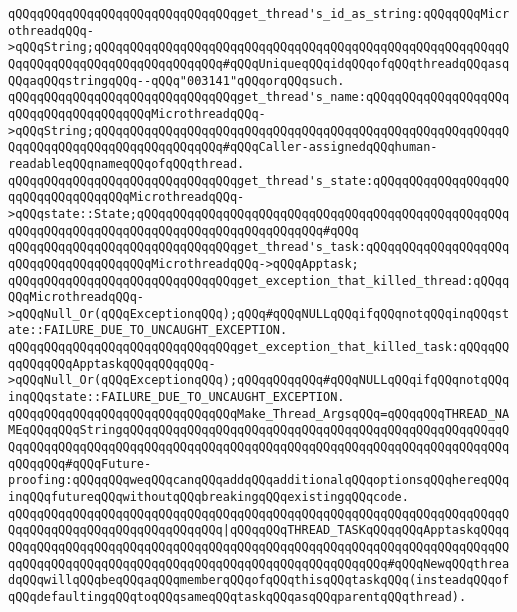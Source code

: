 \verb|qQQqqQQqqQQqqQQqqQQqqQQqqQQqqQQqget_thread's_id_as_string:qQQqqQQqMicrothreadqQQq->qQQqString;qQQqqQQqqQQqqQQqqQQqqQQqqQQqqQQqqQQqqQQqqQQqqQQqqQQqqQQqqQQqqQQqqQQqqQQqqQQqqQQqqQQqqQQq#qQQqUniqueqQQqidqQQqofqQQqthreadqQQqasqQQqaqQQqstringqQQq--qQQq"003141"qQQqorqQQqsuch.|\newline
\verb|qQQqqQQqqQQqqQQqqQQqqQQqqQQqqQQqget_thread's_name:qQQqqQQqqQQqqQQqqQQqqQQqqQQqqQQqqQQqqQQqMicrothreadqQQq->qQQqString;qQQqqQQqqQQqqQQqqQQqqQQqqQQqqQQqqQQqqQQqqQQqqQQqqQQqqQQqqQQqqQQqqQQqqQQqqQQqqQQqqQQqqQQq#qQQqCaller-assignedqQQqhuman-readableqQQqnameqQQqofqQQqthread.|\newline
\verb|qQQqqQQqqQQqqQQqqQQqqQQqqQQqqQQqget_thread's_state:qQQqqQQqqQQqqQQqqQQqqQQqqQQqqQQqqQQqMicrothreadqQQq->qQQqstate::State;qQQqqQQqqQQqqQQqqQQqqQQqqQQqqQQqqQQqqQQqqQQqqQQqqQQqqQQqqQQqqQQqqQQqqQQqqQQqqQQqqQQqqQQqqQQqqQQq#qQQq|\newline
\verb|qQQqqQQqqQQqqQQqqQQqqQQqqQQqqQQqget_thread's_task:qQQqqQQqqQQqqQQqqQQqqQQqqQQqqQQqqQQqqQQqMicrothreadqQQq->qQQqApptask;|\newline
\newline
\verb|qQQqqQQqqQQqqQQqqQQqqQQqqQQqqQQqget_exception_that_killed_thread:qQQqqQQqMicrothreadqQQq->qQQqNull_Or(qQQqExceptionqQQq);qQQq#qQQqNULLqQQqifqQQqnotqQQqinqQQqstate::FAILURE_DUE_TO_UNCAUGHT_EXCEPTION.|\newline
\verb|qQQqqQQqqQQqqQQqqQQqqQQqqQQqqQQqget_exception_that_killed_task:qQQqqQQqqQQqqQQqApptaskqQQqqQQqqQQq->qQQqNull_Or(qQQqExceptionqQQq);qQQqqQQqqQQq#qQQqNULLqQQqifqQQqnotqQQqinqQQqstate::FAILURE_DUE_TO_UNCAUGHT_EXCEPTION.|\newline
\newline
\verb|qQQqqQQqqQQqqQQqqQQqqQQqqQQqqQQqMake_Thread_ArgsqQQq=qQQqqQQqTHREAD_NAMEqQQqqQQqStringqQQqqQQqqQQqqQQqqQQqqQQqqQQqqQQqqQQqqQQqqQQqqQQqqQQqqQQqqQQqqQQqqQQqqQQqqQQqqQQqqQQqqQQqqQQqqQQqqQQqqQQqqQQqqQQqqQQqqQQqqQQqqQQqqQQq#qQQqFuture-proofing:qQQqqQQqweqQQqcanqQQqaddqQQqadditionalqQQqoptionsqQQqhereqQQqinqQQqfutureqQQqwithoutqQQqbreakingqQQqexistingqQQqcode.|\newline
\verb|qQQqqQQqqQQqqQQqqQQqqQQqqQQqqQQqqQQqqQQqqQQqqQQqqQQqqQQqqQQqqQQqqQQqqQQqqQQqqQQqqQQqqQQqqQQqqQQqqQQq|\verb#|qQQqqQQqTHREAD_TASKqQQqqQQqApptaskqQQqqQQqqQQqqQQqqQQqqQQqqQQqqQQqqQQqqQQqqQQqqQQqqQQqqQQqqQQqqQQqqQQqqQQqqQQqqQQqqQQqqQQqqQQqqQQqqQQqqQQqqQQqqQQqqQQqqQQqqQQqqQQq#\verb|#qQQqNewqQQqthreadqQQqwillqQQqbeqQQqaqQQqmemberqQQqofqQQqthisqQQqtaskqQQq(insteadqQQqofqQQqdefaultingqQQqtoqQQqsameqQQqtaskqQQqasqQQqparentqQQqthread).|\newline
